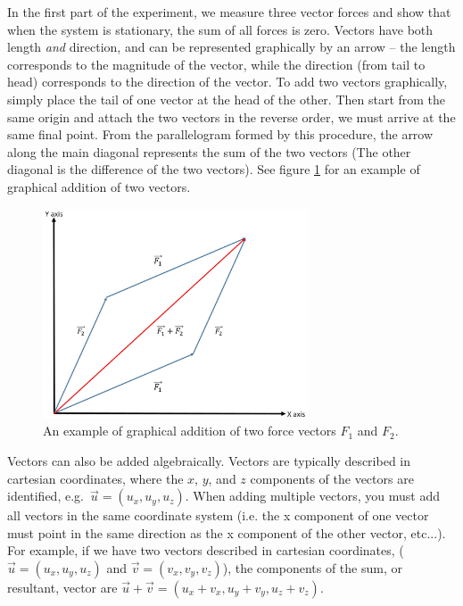 In the first part of the experiment, we measure three vector forces and show that when the system is stationary, the sum of all forces is zero. Vectors have both length \emph{and} direction, and can be represented graphically by an arrow -- the length corresponds to the magnitude of the vector, while the direction (from tail to head) corresponds to the direction of the vector. To add two vectors graphically, simply place the tail of one vector at the head of the other. Then start from the same origin and attach the two vectors in the reverse order, we must arrive at the same final point. From the parallelogram formed by this procedure, the arrow along the main diagonal represents the sum of the two vectors (The other diagonal is the difference of the two vectors). See figure \ref{fig:graph} for an example of graphical addition of two vectors.
\begin{figure}[h]
    \begin{center}
        \includegraphics[width=0.7\textwidth]{./Exp1-4/pic/image11.jpg}
    \end{center}
    \caption{An example of graphical addition of two force vectors $F_1$ and $F_2$.}
    \label{fig:graph}
\end{figure}

Vectors can also be added algebraically. Vectors are typically described in cartesian coordinates, where the $x$, $y$, and $z$ components of the vectors are identified, e.g.\ $\vec u = (u_x,u_y,u_z)$. When adding multiple vectors, you must add all vectors in the same coordinate system (i.e. the x component of one vector must point in the same direction as the x component of the other vector, etc...). For example, if we have two vectors described in cartesian coordinates, ($\vec u = (u_x,u_y,u_z)$ and $\vec v = (v_x,v_y,v_z)$), the components of the sum, or resultant, vector are $\vec u+\vec v = (u_x + v_x, u_y + v_y, u_z + v_z)$.\myskip

